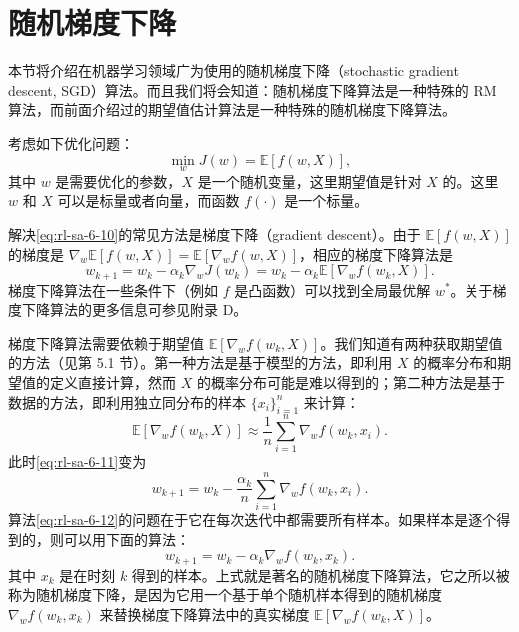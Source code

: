 \section{随机梯度下降}
\label{sec:rl-sa-sgd}

本节将介绍在机器学习领域广为使用的随机梯度下降（stochastic gradient descent, SGD）算法。而且我们将会知道：随机梯度下降算法是一种特殊的 RM 算法，而前面介绍过的期望值估计算法是一种特殊的随机梯度下降算法。

考虑如下优化问题：
\begin{equation}
\min_w J(w) = \mathbb{E}[f(w, X)],
\label{eq:rl-sa-6-10}
\end{equation}
其中 $w$ 是需要优化的参数，$X$ 是一个随机变量，这里期望值是针对 $X$ 的。这里 $w$ 和 $X$ 可以是标量或者向量，而函数 $f(\cdot)$ 是一个标量。

解决\eqref{eq:rl-sa-6-10}的常见方法是梯度下降（gradient descent）。由于 $\mathbb{E}[f(w, X)]$ 的梯度是 $\nabla_w \mathbb{E}[f(w, X)] = \mathbb{E}[\nabla_w f(w, X)]$，相应的梯度下降算法是
\begin{equation}
w_{k+1} = w_k - \alpha_k \nabla_w J(w_k) = w_k - \alpha_k \mathbb{E}[\nabla_w f(w_k, X)].
\label{eq:rl-sa-6-11}
\end{equation}
梯度下降算法在一些条件下（例如 $f$ 是凸函数）可以找到全局最优解 $w^*$。关于梯度下降算法的更多信息可参见附录 D。

梯度下降算法需要依赖于期望值 $\mathbb{E}[\nabla_w f(w_k, X)]$。我们知道有两种获取期望值的方法（见第 5.1 节）。第一种方法是基于模型的方法，即利用 $X$ 的概率分布和期望值的定义直接计算，然而 $X$ 的概率分布可能是难以得到的；第二种方法是基于数据的方法，即利用独立同分布的样本 $\{x_i\}_{i=1}^n$ 来计算：
\begin{equation}
\mathbb{E}[\nabla_w f(w_k, X)] \approx \frac{1}{n} \sum_{i=1}^{n} \nabla_w f(w_k, x_i).
\end{equation}
此时\eqref{eq:rl-sa-6-11}变为
\begin{equation}
w_{k+1} = w_k - \frac{\alpha_k}{n} \sum_{i=1}^{n} \nabla_w f(w_k, x_i).
\label{eq:rl-sa-6-12}
\end{equation}
算法\eqref{eq:rl-sa-6-12}的问题在于它在每次迭代中都需要所有样本。如果样本是逐个得到的，则可以用下面的算法：
\begin{equation}
w_{k+1} = w_k - \alpha_k \nabla_w f(w_k, x_k).
\label{eq:rl-sa-6-13}
\end{equation}
其中 $x_k$ 是在时刻 $k$ 得到的样本。上式就是著名的随机梯度下降算法，它之所以被称为随机梯度下降，是因为它用一个基于单个随机样本得到的随机梯度 $\nabla_w f(w_k, x_k)$ 来替换梯度下降算法中的真实梯度 $\mathbb{E}[\nabla_w f(w_k, X)]$。

